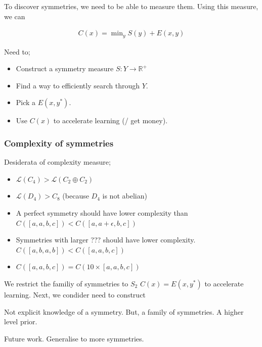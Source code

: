 To discover symmetries, we need to be able to measure them. Using this measure, we can

\begin{align*}
C(x) = \mathop{\text{min}}_y S(y) + E(x, y)
\end{align*}

Need to;

\begin{itemize}
	\tightlist
	\item Construct a symmetry measure $S: Y \to \mathbb R^+$
	\item Find a way to efficiently search through $Y$.
	\item Pick a $E(x, y^{* })$.
	\item Use $C(x)$ to accelerate learning (/ get money).
\end{itemize}

\subsubsection{Complexity of symmetries}

Desiderata of complexity measure;

\begin{itemize}
	\tightlist
	\item $\mathcal L(C_4) > \mathcal L(C_2 \oplus C_2)$
	\item $\mathcal L(D_4) > C_8$ (because $D_4$ is not abelian)
	\item A perfect symmetry should have lower complexity than $C([a,a,b,c]) < C([a,a+\epsilon,b,c])$
	\item Symmetries with larger ??? should have lower complexity. $C([a,b,a,b]) < C([a,a,b,c])$
	\item $C([a,a,b,c]) = C(10 \times [a,a,b,c])$
\end{itemize}


We restrict the familiy of symmetries to $S_2$ $C(x) = E(x, y^{* })$ to accelerate learning.
Next, we condider need to construct

Not explicit knowledge of a symmetry. But, a family of symmetries. A higher level prior.

Future work. Generalise to more symmetries.


